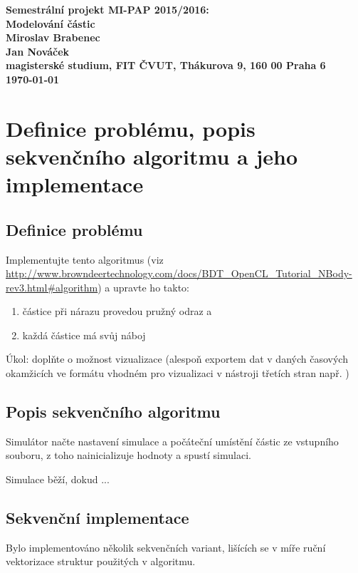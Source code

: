 \documentclass[12pt]{article}
\begin{document}
\begin{center}
\bf Semestrální projekt MI-PAP 2015/2016:\\[5mm]
    Modelování částic\\[5mm]
       Miroslav Brabenec\\
       Jan Nováček\\[2mm]
magisterské studium, FIT ČVUT, Thákurova 9, 160 00 Praha 6\\[2mm]
\today
\end{center}
%
%
%
%
%
\section{Definice problému, popis sekvenčního algoritmu a jeho implementace}

\subsection{Definice problému}
Implementujte tento algoritmus (viz \url{http://www.browndeertechnology.com/docs/BDT_OpenCL_Tutorial_NBody-rev3.html#algorithm}) a upravte ho takto:

\begin{enumerate}
\item	částice při nárazu provedou pružný odraz a
\item	každá částice má svůj náboj
\end{enumerate}

Úkol: doplňte o možnost vizualizace (alespoň exportem dat v daných časových okamžicích ve formátu vhodném pro vizualizaci v nástroji třetích stran např. ) 

\subsection{Popis sekvenčního algoritmu}
Simulátor načte nastavení simulace a počáteční umístění částic ze vstupního souboru, z toho nainicializuje hodnoty a spustí simulaci.

Simulace běží, dokud ...

\subsection{Sekvenční implementace}

Bylo implementováno několik sekvenčních variant, lišících se v míře ruční vektorizace struktur použitých v algoritmu.
\end{document}
